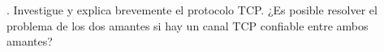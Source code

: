 . Investigue y explica brevemente el protocolo TCP.
¿Es posible resolver el problema de los dos amantes
si hay un canal TCP confiable entre ambos amantes?
